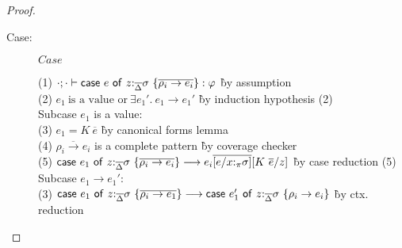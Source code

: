 \begin{proof}
\begin{description}
\item[Case:] $Case$
\begin{tabbing}
(1) $\cdot; \cdot \vdash \mathsf{case}~e~\mathsf{of}~z{:}_{\overline{\Delta}}\sigma~\{\overline{\rho_i \to e_i}\} : \varphi$ \` by assumption \\
(2) $e_1~\textrm{is a value or}~\exists e_1'.~e_1 \longrightarrow e_1'$ \` by induction hypothesis (2) \\
\textrm{Subcase $e_1$ is a value:}\\
(3) $e_1 = K~\overline{e}$ \` by canonical forms lemma \\
(4) $\overline{\rho_i \to e_i}$ is a complete pattern \` by coverage checker\\
(5) $\mathsf{case}~e_1~\mathsf{of}~z{:}_{\overline{\Delta}}\sigma~\{\overline{\rho_i \to e_i}\} \longrightarrow e_i\overline{[e/x{:}_\pi\sigma]}[K~\overline{e}/z]$ \` by case reduction (5) \\
\textrm{Subcase $e_1 \to e_1'$:}\\
(3) $\mathsf{case}~e_1~\mathsf{of}~z{:}_{\overline{\Delta}}\sigma~\{\overline{\rho_i \to e_1}\}
  \longrightarrow \mathsf{case}~e_1'~\mathsf{of}~z{:}_{\overline{\Delta}}\sigma~\{\rho_i \to e_i\}$ \` by ctx. reduction\\
\end{tabbing}

\end{description}

\end{proof}

